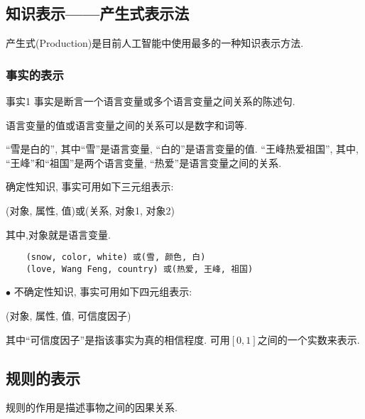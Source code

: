 \subsection{知识表示——产生式表示法}
产生式(Production)是目前人工智能中使用最多的一种知识表示方法.

%
%
%
%
%
%
\subsubsection{事实的表示}
\begin{mydef}{事实}{1}
    事实是断言一个语言变量或多个语言变量之间关系的陈述句.
\end{mydef}

\begin{remark}
    语言变量的值或语言变量之间的关系可以是数字和词等.
\end{remark}
\begin{example}
    “雪是白的”, 其中“雪”是语言变量, “白的”是语言变量的值.
    “王峰热爱祖国”, 其中, “王峰”和“祖国”是两个语言变量, “热爱”是语言变量之间的关系.
\end{example}
\begin{example}
    确定性知识, 事实可用如下三元组表示:
\begin{center}
    (对象, 属性, 值)或(关系, 对象1, 对象2)
\end{center}
其中,对象就是语言变量.

\begin{Verbatim}
    (snow, color, white) 或(雪, 颜色, 白)
    (love, Wang Feng, country) 或(热爱, 王峰, 祖国)
\end{Verbatim}

$\bullet$ 不确定性知识, 事实可用如下四元组表示:
\begin{center}
    (对象, 属性, 值, 可信度因子)
\end{center}
其中“可信度因子”是指该事实为真的相信程度. 可用$[0,1]$之间的一个实数来表示.
\end{example}
\subsection{规则的表示}
规则的作用是描述事物之间的因果关系.


